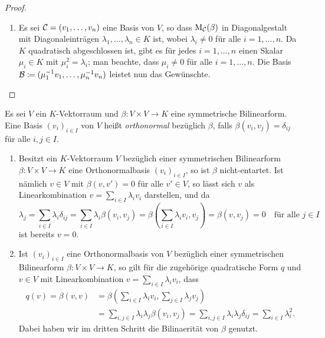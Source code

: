 \documentclass[a4paper,10pt,numbers=noenddot]{scrartcl}
\begin{document}
\begin{proof}
\begin{enumerate}[leftmargin=*]
    \item
      Es sei $\mathcal{C} = (v_1, \dotsc, v_n)$ eine Basis von $V$, so dass $\operatorname{M}_{\mathcal{C}}(\beta)$ in Diagonalgestalt mit Diagonaleinträgen $\lambda_1, \dotsc, \lambda_n \in K$ ist, wobei $\lambda_i \neq 0$ für alle $i = 1, \dotsc, n$.
      Da $K$ quadratisch abgeschlossen ist, gibt es für jedes $i = 1, \dotsc, n$ einen Skalar $\mu_i \in K$ mit $\mu_i^2 = \lambda_i$; man beachte, dass $\mu_i \neq 0$ für alle $i = 1, \dotsc, n$.
      Die Basis $\mathcal{B} \coloneqq (\mu_1^{-1} v_1, \dotsc, \mu_n^{-1} v_n)$ leistet nun das Gewünschte.
    \qedhere
  \end{enumerate}
\end{proof}


\begin{definition}
  Es sei $V$ ein $K$-Vektorraum und $\beta \colon V \times V \to K$ eine symmetrische Bilinearform.
  Eine Basis $(v_i)_{i \in I}$ von $V$ heißt \emph{orthonormal} bezüglich $\beta$, falls $\beta(v_i, v_j) = \delta_{ij}$ für alle $i,j \in I$.
\end{definition}


\begin{remark}
  \begin{enumerate}[leftmargin=*]
    \item
      Besitzt ein $K$-Vektorraum $V$ bezüglich einer symmetrischen Bilinearform $\beta \colon V \times V \to K$ eine Orthonormalbasis $(v_i)_{i \in I}$, so ist $\beta$ nicht-entartet.
      Ist nämlich $v \in V$ mit $\beta(v, v') = 0$ für alle $v' \in V$, so lässt sich $v$ als Linearkombination $v = \sum_{i \in I} \lambda_i v_i$ darstellen, und da
      \[
          \lambda_j
        = \sum_{i \in I} \lambda_i \delta_{ij}
        = \sum_{i \in I} \lambda_i \beta(v_i, v_j)
        = \beta\left( \sum_{i \in I} \lambda_i v_i, v_j \right)
        = \beta(v, v_j)
        = 0
        \quad
        \text{für alle $j \in I$}
      \]
      ist bereits $v = 0$.
    \item
      Ist $(v_i)_{i \in I}$ eine Orthonormalbasis von $V$ bezüglich einer symmetrischen Bilinearform $\beta \colon V \times V \to K$, so gilt für die zugehörige quadratische Form $q$ und $v \in V$ mit Linearkombination $v = \sum_{i \in I} \lambda_i v_i$, dass
      \begin{align*}
            q(v)
         =  \beta(v,v)
        &=  \beta\left( \sum_{i \in I} \lambda_i v_i, \sum_{j \in I} \lambda_j v_j \right)  \\
        &=  \sum_{i,j \in I} \lambda_i \lambda_j \beta(v_i, v_j)
         =  \sum_{i,j \in I} \lambda_i \lambda_j \delta_{ij}
         =  \sum_{i \in I} \lambda_i^2.
      \end{align*}
      Dabei haben wir im dritten Schritt die Bilinaerität von $\beta$ genutzt.
  \end{enumerate}
\end{remark}
\end{document}
